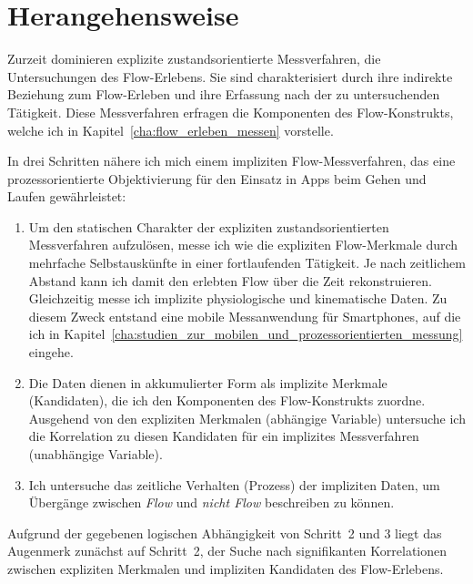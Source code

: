 

\section{Herangehensweise} 

\label{sec:herangehensweise}

Zurzeit dominieren explizite zustandsorientierte Messverfahren, die Untersuchungen des Flow-Erlebens. Sie sind charakterisiert durch ihre indirekte Beziehung zum Flow-Erleben und ihre Erfassung nach der zu untersuchenden Tätigkeit. Diese Messverfahren erfragen die Komponenten des Flow-Konstrukts, welche ich in Kapitel~\ref{cha:flow_erleben_messen} vorstelle. 

In drei Schritten nähere ich mich einem impliziten Flow-Messverfahren, das eine prozessorientierte Objektivierung für den Einsatz in Apps beim Gehen und Laufen gewährleistet: 
\begin{enumerate}
	\item Um den statischen Charakter der expliziten zustandsorientierten Messverfahren aufzulösen, messe ich wie \citet{Reinhardt2006, Schuler2009} die expliziten Flow-Merkmale durch mehrfache Selbstauskünfte in einer fortlaufenden Tätigkeit. Je nach zeitlichem Abstand kann ich damit den erlebten Flow über die Zeit rekonstruieren. Gleichzeitig messe ich implizite physiologische und kinematische Daten. Zu diesem Zweck entstand eine mobile Messanwendung für Smartphones, auf die ich in Kapitel~\ref{cha:studien_zur_mobilen_und_prozessorientierten_messung} eingehe.
	
	\item Die Daten dienen in akkumulierter Form als implizite Merkmale (Kandidaten), die ich den Komponenten des Flow-Konstrukts zuordne. Ausgehend von den expliziten Merkmalen (abhängige Variable) untersuche ich die Korrelation zu diesen Kandidaten für ein implizites Messverfahren (unabhängige Variable).
	
	\item Ich untersuche das zeitliche Verhalten (Prozess) der impliziten Daten, um Übergänge zwischen \emph{Flow} und \emph{nicht Flow} beschreiben zu können. 
\end{enumerate}

Aufgrund der gegebenen logischen Abhängigkeit von Schritt~2 und 3 liegt das Augenmerk zunächst auf Schritt~2, der Suche nach signifikanten Korrelationen zwischen expliziten Merkmalen und impliziten Kandidaten des Flow-Erlebens. 

